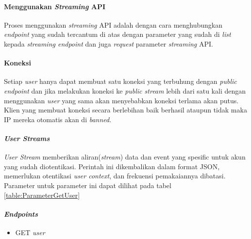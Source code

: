 \paragraph{Menggunakan \textit{Streaming} API}
Proses menggunakan \textit{streaming} API adalah dengan cara menghubungkan \textit{endpoint} yang sudah tercantum di atas dengan parameter yang sudah di \textit{list} kepada \textit{streaming endpoint} dan juga \textit{request} parameter \textit{streaming} API.

\paragraph{Koneksi}
Setiap \textit{user} hanya dapat membuat satu koneksi yang terbuhung dengan \textit{public endpoint} dan jika melakukan koneksi ke \textit{public stream} lebih dari satu kali dengan menggunakan \textit{user} yang sama akan menyebabkan koneksi terlama akan putus. Klien yang membuat koneksi secara berlebihan baik berhasil ataupun tidak maka IP mereka otomatis akan di \textit{banned}.

\paragraph{\textit{User Streams}}
\textit{User Stream} memberikan aliran(\textit{stream}) data dan event yang spesific untuk akun yang sudah diotentikasi. Perintah ini dikembalikan dalam format JSON, memerlukan otentikasi \textit{user context}, dan frekuensi pemakaiannya dibatasi. Parameter untuk parameter ini dapat dilihat pada tabel \ref{table:ParameterGetUser}


\paragraph{\textit{Endpoints}}
\begin{itemize}
	\item GET \textit{user}
\end{itemize}

